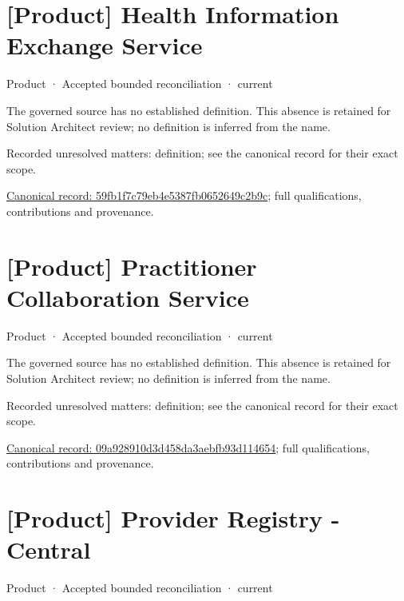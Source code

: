 \section{[Product] Health Information Exchange Service}

\label{element:59fb1f7c79eb4e5387fb0652649c2b9c}
{\small Product · Accepted bounded reconciliation · current}\par

The governed source has no established definition. This absence is retained for Solution Architect review; no definition is inferred from the name.


{\small Recorded unresolved matters: definition; see the canonical record for their exact scope.}\par
{\footnotesize \href{../../../../continuum/business/product/59fb1f7c79eb4e5387fb0652649c2b9c.md}{Canonical record: 59fb1f7c79eb4e5387fb0652649c2b9c}; full qualifications, contributions and provenance.}\par
\section{[Product] Practitioner Collaboration Service}

\label{element:09a928910d3d458da3aebfb93d114654}
{\small Product · Accepted bounded reconciliation · current}\par

The governed source has no established definition. This absence is retained for Solution Architect review; no definition is inferred from the name.


{\small Recorded unresolved matters: definition; see the canonical record for their exact scope.}\par
{\footnotesize \href{../../../../continuum/business/product/09a928910d3d458da3aebfb93d114654.md}{Canonical record: 09a928910d3d458da3aebfb93d114654}; full qualifications, contributions and provenance.}\par
\section{[Product] Provider Registry - Central}

\label{element:407f93e81fd740e6b10728941a5a5172}
{\small Product · Accepted bounded reconciliation · current}\par

